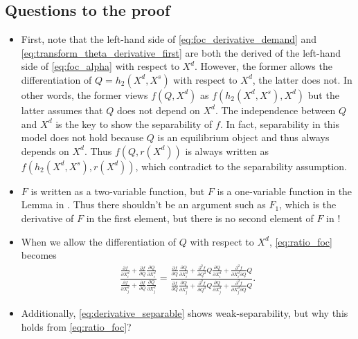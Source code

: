 \documentclass[11pt, a4paper]{article}
\theoremstyle{remark}
\begin{document}
\subsection{Questions to the proof}

\begin{itemize}
    \item First, note that the left-hand side of \eqref{eq:foc_derivative_demand} and \eqref{eq:transform_theta_derivative_first} are both the derived of the left-hand side of \eqref{eq:foc_alpha} with respect to $X^{d}$.
    However, the former allows the differentiation of $Q = h_2(X^{d}, X^{s})$ with respect to $X^{d}$, the latter does not.
    In other words, the former views $f(Q, X^{d})$ as $f(h_2(X^{d}, X^{s}), X^{d})$ but the latter assumes that $Q$ does not depend on $X^{d}$.
    The independence between $Q$ and $X^{d}$ is the key to show the separability of $f$.
    In fact, separability in this model does not hold because $Q$ is an equilibrium object and thus always depends on $X^{d}$. 
    Thus $f(Q, r(X^{d}))$ is always written as $f(h_2(X^{d}, X^{s}), r(X^{d}))$, which contradict to the separability assumption.
    \item $F$ is written as a two-variable function, but $F$ is a one-variable function in the Lemma in \citet{goldmanNote1964}. Thus there shouldn't be an argument such as $F_1$, which is the derivative of $F$ in the first element, but there is no second element of $F$ in \citet{goldmanNote1964}!
    \item 
    When we allow the differentiation of $Q$ with respect to $X^{d}$, \eqref{eq:ratio_foc} becomes
    \begin{align}
        \frac{\frac{\partial f}{\partial X^{d}_{i}} + \frac{\partial f}{\partial Q} \frac{\partial Q}{\partial X^{d}_{i}}}{\frac{\partial f}{\partial X^{d}_{j}} + \frac{\partial f}{\partial Q} \frac{\partial Q}{\partial X^{d}_{j}}} = \frac{\frac{\partial f}{\partial Q}\frac{\partial Q}{\partial X^{d}_{i}}  + \frac{\partial^2 f}{\partial Q^2}Q\frac{\partial Q}{\partial X^{d}_{i}} + \frac{\partial^2 f}{\partial X^{d}_{i}\partial Q}Q }{\frac{\partial f}{\partial Q}\frac{\partial Q}{\partial X^{d}_{j}}  + \frac{\partial^2 f}{\partial Q^2}Q\frac{\partial Q}{\partial X^{d}_{j}} + \frac{\partial^2 f}{\partial X^{d}_{j}\partial Q}Q }.
    \end{align}
    \item 
    Additionally, \eqref{eq:derivative_separable} shows weak-separability, but why this holds from \eqref{eq:ratio_foc}?
    \begin{align}

\end{align}
\end{itemize}
\end{document}
